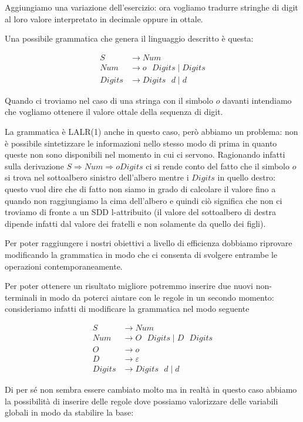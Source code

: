 \documentclass[class=book, crop=false, oneside, 12pt]{standalone}
\begin{document}
Aggiungiamo una variazione dell'esercizio: ora vogliamo tradurre stringhe di digit al loro valore interpretato in decimale oppure in ottale.

Una possibile grammatica che genera il linguaggio descritto è questa:

\begin{align*}
    S &\to Num \\
    Num &\to o \textrm{ } Digits \mid Digits \\
    Digits &\to Digits \textrm{ } d \mid d
\end{align*}

Quando ci troviamo nel caso di una stringa con il simbolo \(o\) davanti intendiamo che vogliamo ottenere il valore ottale della sequenza di digit. 

La grammatica è LALR(1) anche in questo caso, però abbiamo un problema: non è possibile sintetizzare le informazioni nello stesso modo di prima in quanto queste non sono disponibili nel momento in cui ci servono. Ragionando infatti sulla derivazione \(S \Rightarrow Num \Rightarrow o Digits\) ci si rende conto del fatto che il simbolo \(o\) si trova nel sottoalbero sinistro dell'albero mentre i \(Digits\) in quello destro: questo vuol dire che di fatto non siamo in grado di calcolare il valore fino a quando non raggiungiamo la cima dell'albero e quindi ciò significa che non ci troviamo di fronte a un SDD l-attribuito (il valore del sottoalbero di destra dipende infatti dal valore dei fratelli e non solamente da quello dei figli).

Per poter raggiungere i nostri obiettivi a livello di efficienza dobbiamo riprovare modificando la grammatica in modo che ci consenta di svolgere entrambe le operazioni contemporaneamente.

Per poter ottenere un risultato migliore potremmo inserire due nuovi non-terminali in modo da poterci aiutare con le regole in un secondo momento: consideriamo infatti di modificare la grammatica nel modo seguente

\begin{align*}
    S &\to Num \\
    Num &\to O \textrm{ } Digits \mid D \textrm{ } Digits \\
    O &\to o \\ 
    D &\to \varepsilon \\
    Digits &\to Digits \textrm{ } d \mid d
\end{align*}

Di per sé non sembra essere cambiato molto ma in realtà in questo caso abbiamo la possibilità di inserire delle regole dove possiamo valorizzare delle variabili globali in modo da stabilire la base:
\end{document}
